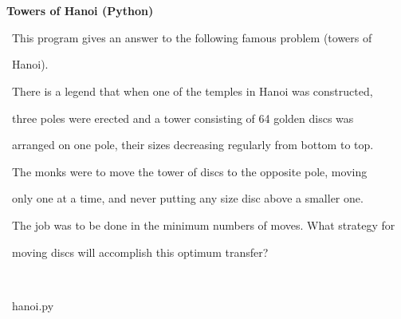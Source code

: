 \documentclass[a4paper,10pt]{article}
\def\mc{\relax}
\begin{document}
\tt\mc 

\noindent
\mbox{}\rm\mc {\tt\#} \hrulefill 
\tt\mc 

\noindent
\mbox{}\rm\mc {\tt\#} \ %
\tt\mc 

\noindent
\mbox{}\rm\mc {\tt\#} \ \centerline{\bf Towers of Hanoi (Python)} 
\tt\mc 

\noindent
\mbox{}\rm\mc {\tt\#}  
\tt\mc 

\noindent
\mbox{}\rm\mc {\tt\#} \ \hspace{\leftmargini}This program gives an answer to the following famous problem (towers of 
\tt\mc 

\noindent
\mbox{}\rm\mc {\tt\#} \ \hspace{\leftmargini}Hanoi). 
\tt\mc 

\noindent
\mbox{}\rm\mc {\tt\#} \ \hspace{\leftmargini}There is a legend that when one of the temples in Hanoi was constructed, 
\tt\mc 

\noindent
\mbox{}\rm\mc {\tt\#} \ \hspace{\leftmargini}three poles were erected and a tower consisting of 64 golden discs was 
\tt\mc 

\noindent
\mbox{}\rm\mc {\tt\#} \ \hspace{\leftmargini}arranged on one pole, their sizes decreasing regularly from bottom to top. 
\tt\mc 

\noindent
\mbox{}\rm\mc {\tt\#} \ \hspace{\leftmargini}The monks were to move the tower of discs to the opposite pole, moving 
\tt\mc 

\noindent
\mbox{}\rm\mc {\tt\#} \ \hspace{\leftmargini}only one at a time, and never putting any size disc above a smaller one. 
\tt\mc 

\noindent
\mbox{}\rm\mc {\tt\#} \ \hspace{\leftmargini}The job was to be done in the minimum numbers of moves. What strategy for 
\tt\mc 

\noindent
\mbox{}\rm\mc {\tt\#} \ \hspace{\leftmargini}moving discs will accomplish this optimum transfer? 
\tt\mc 

\noindent
\mbox{}\rm\mc {\tt\#}  \ %
\tt\mc 

\noindent
\mbox{}\rm\mc {\tt\#} \hrulefill\ hanoi.py \ \hrulefill
\tt\mc 

\noindent
\mbox{}\hfill
\end{document}
